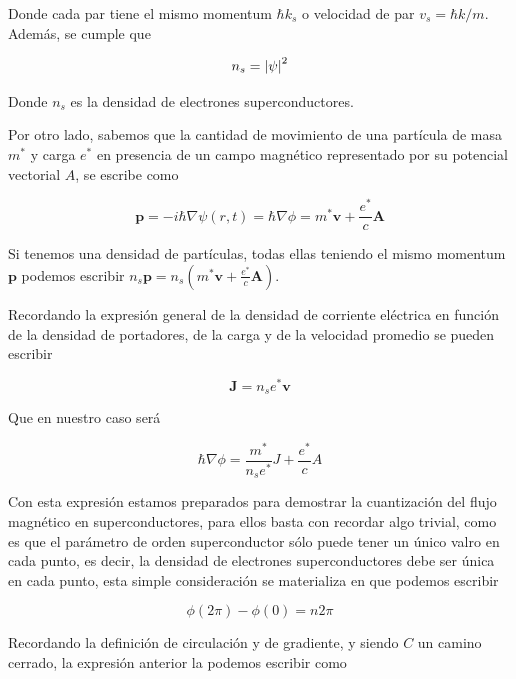 Donde cada par tiene el mismo momentum $\hbar k_s$ o velocidad de par $v_s = \hbar k/m$. Además, se cumple que

\begin{equation}
    n_s = \abs{\psi}^2
\end{equation}
    
Donde $n_s$ es la densidad de electrones superconductores.

Por otro lado, sabemos que la cantidad de movimiento de una partícula de masa $m^*$ y carga $e^*$ en presencia de un campo magnético representado por su potencial vectorial $A$, se escribe como

\begin{equation}
    \mathbf{p} = -i \hbar \nabla \psi(r,t) = \hbar \nabla \phi = m^* \mathbf{v} + \frac{e^*}{c} \mathbf{A}
\end{equation}

Si tenemos una densidad de partículas, todas ellas teniendo el mismo momentum $\mathbf{p}$ podemos escribir $n_s \mathbf{p} = n_s (m^* \mathbf{v} + \frac{e^*}{c} \mathbf{A})$.

Recordando la expresión general de la densidad de corriente eléctrica en función de la densidad de portadores, de la carga y de la velocidad promedio se pueden escribir

\begin{equation}
    \mathbf{J} = n_s e^* \mathbf{v}
\end{equation}

Que en nuestro caso será

\begin{equation}
    \hbar \nabla \phi = \frac{m^*}{n_s e^*} J + \frac{e^*}{c} A
\end{equation}

Con esta expresión estamos preparados para demostrar la cuantización del flujo magnético en superconductores, para ellos basta con recordar algo trivial, como es que el parámetro de orden superconductor sólo puede tener un único valro en cada punto, es decir, la densidad de electrones superconductores debe ser única en cada punto, esta simple consideración se materializa en que podemos escribir

\begin{equation}
    \phi(2\pi) - \phi(0) = n 2 \pi
\end{equation}

Recordando la definición de circulación y de gradiente, y siendo $C$ un camino cerrado, la expresión anterior la podemos escribir como

